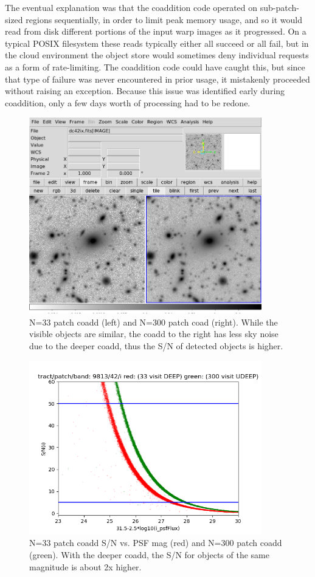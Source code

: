 The eventual explanation was that the coaddition code operated on sub-patch-sized regions
sequentially, in order to limit peak memory usage, and so it would read from disk different portions
of the input warp images as it progressed. On a typical POSIX filesystem these reads typically
either all succeed or all fail, but in the cloud environment the object store would sometimes deny
individual requests as a form of rate-limiting. The coaddition code could have caught this, but
since that type of failure was never encountered in prior usage, it mistakenly proceeded without
raising an exception. Because this issue was identified early during coaddition, only a few days
worth of processing had to be redone.


 \begin{figure}
 \includegraphics[width=0.9\textwidth]{sidebyside9813p42bi.png}
	 \caption{N=33 patch coadd (left) and N=300 patch coad (right).  While the visible objects are similar, the coadd to the right has less sky noise due to the deeper coadd, thus the S/N of detected objects is higher.  \label{fig:coadd}}
 \end{figure}

 \begin{figure}
 \includegraphics[width=0.9\textwidth]{redgreen31.5.png}
	 \caption{N=33 patch coadd S/N vs. PSF mag (red) and N=300 patch coadd (green).  With the deeper coadd, the S/N for objects of the same magnitude is about 2x higher.  \label{fig:s2n}}
 \end{figure}

